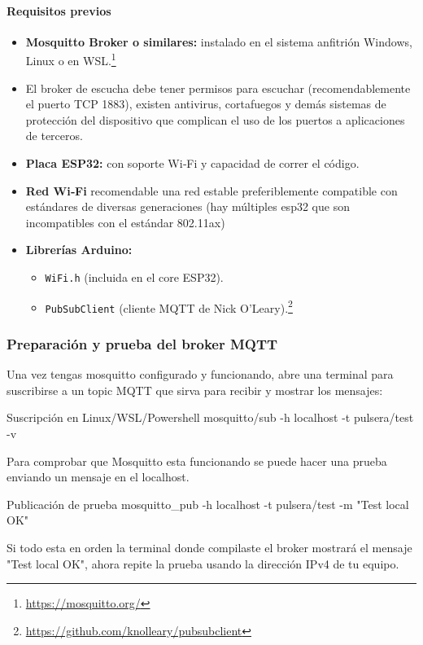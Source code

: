 \documentclass[12pt, a4paper]{article}
\begin{document}
\begin{umaappendices}
		\paragraph{Requisitos previos}
		\begin{itemize}
			\item \textbf{Mosquitto Broker o similares:} instalado en el sistema anfitrión Windows, Linux o en WSL.\footnote{\url{https://mosquitto.org/}} 
			\item El broker de escucha debe tener permisos para escuchar (recomendablemente el puerto TCP 1883), existen antivirus, cortafuegos y demás sistemas de protección del dispositivo que complican el uso de los puertos a aplicaciones de terceros.
			\item \textbf{Placa ESP32:} con soporte Wi‑Fi y capacidad de correr el código.
			\item \textbf{Red Wi‑Fi} recomendable una red estable preferiblemente compatible con estándares de diversas generaciones (hay múltiples esp32 que son incompatibles con el estándar 802.11ax)
			\item \textbf{Librerías Arduino:}
			\begin{itemize}
				\item \texttt{WiFi.h} (incluida en el core ESP32).
				\item \texttt{PubSubClient} (cliente MQTT de Nick O’Leary).\footnote{\url{https://github.com/knolleary/pubsubclient}}
			\end{itemize}
		\end{itemize}
		
		\subsubsection{Preparación y prueba del broker MQTT}
		Una vez tengas mosquitto configurado y funcionando, abre una terminal para suscribirse a un topic MQTT que sirva para recibir y mostrar los mensajes:
		\begin{Terminal}{Suscripción en Linux/WSL/Powershell}
			mosquitto/sub -h localhost -t pulsera/test -v
		\end{Terminal}
		Para comprobar que Mosquitto esta funcionando se puede hacer una prueba enviando un mensaje en el localhost. 
		\begin{Terminal}{Publicación de prueba}
			mosquitto\_pub -h localhost -t pulsera/test -m "Test local OK"
		\end{Terminal}

		Si todo esta en orden la terminal donde compilaste el broker mostrará el mensaje "Test local OK", ahora repite la prueba usando la dirección IPv4 de tu equipo.
		

\end{umaappendices}
\end{document}
